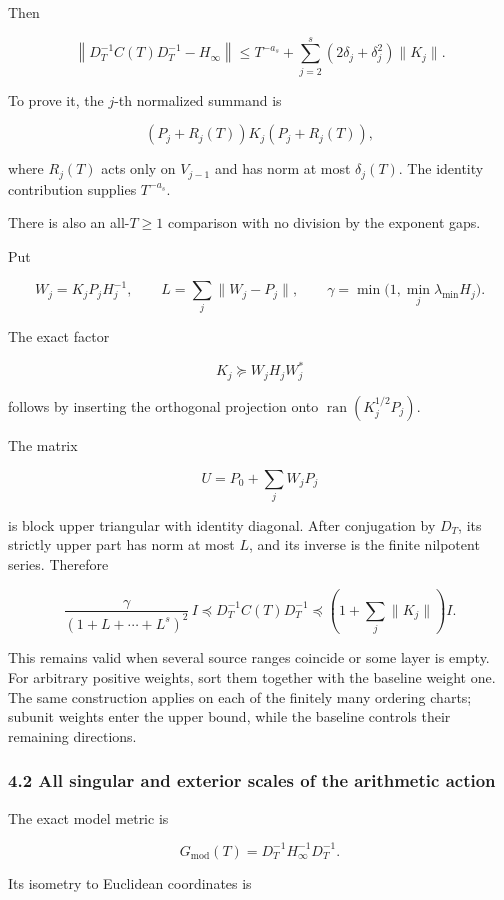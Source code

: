 \documentclass[11pt]{article}
\begin{document}
Then

\[
\boxed{
\left\|D_T^{-1}C(T)D_T^{-1}-H_\infty\right\|
\le
T^{-a_s}
+\sum_{j=2}^s
(2\delta_j+\delta_j^2)\|K_j\|.
}
\tag{27}
\]

To prove it, the \(j\)-th normalized summand is

\[
(P_j+R_j(T))K_j(P_j+R_j(T)),
\]

where \(R_j(T)\) acts only on \(V_{j-1}\) and has norm at most \(\delta_j(T)\). The identity contribution supplies \(T^{-a_s}\).

There is also an all-\(T\ge1\) comparison with no division by the exponent gaps.

Put

\[
W_j=K_jP_jH_j^{-1},
\qquad
L=\sum_j\|W_j-P_j\|,
\qquad
\gamma=\min\bigl(1,\min_j\lambda_{\min}H_j\bigr).
\]

The exact factor

\[
K_j\succeq W_jH_jW_j^*
\]

follows by inserting the orthogonal projection onto \(\operatorname{ran}(K_j^{1/2}P_j)\).

The matrix

\[
U=P_0+\sum_jW_jP_j
\]

is block upper triangular with identity diagonal. After conjugation by \(D_T\), its strictly upper part has norm at most \(L\), and its inverse is the finite nilpotent series. Therefore

\[
\boxed{
\frac{\gamma}{(1+L+\cdots+L^s)^2}\,I
\preceq
D_T^{-1}C(T)D_T^{-1}
\preceq
\left(1+\sum_j\|K_j\|\right)I.
}
\tag{28}
\]

This remains valid when several source ranges coincide or some layer is empty. For arbitrary positive weights, sort them together with the baseline weight one. The same construction applies on each of the finitely many ordering charts; subunit weights enter the upper bound, while the baseline controls their remaining directions.

\subsubsection{4.2 All singular and exterior scales of the arithmetic action}\label{all-singular-and-exterior-scales-of-the-arithmetic-action}

The exact model metric is

\[
G_{\mathrm{mod}}(T)=D_T^{-1}H_\infty^{-1}D_T^{-1}.
\]

Its isometry to Euclidean coordinates is
\end{document}
